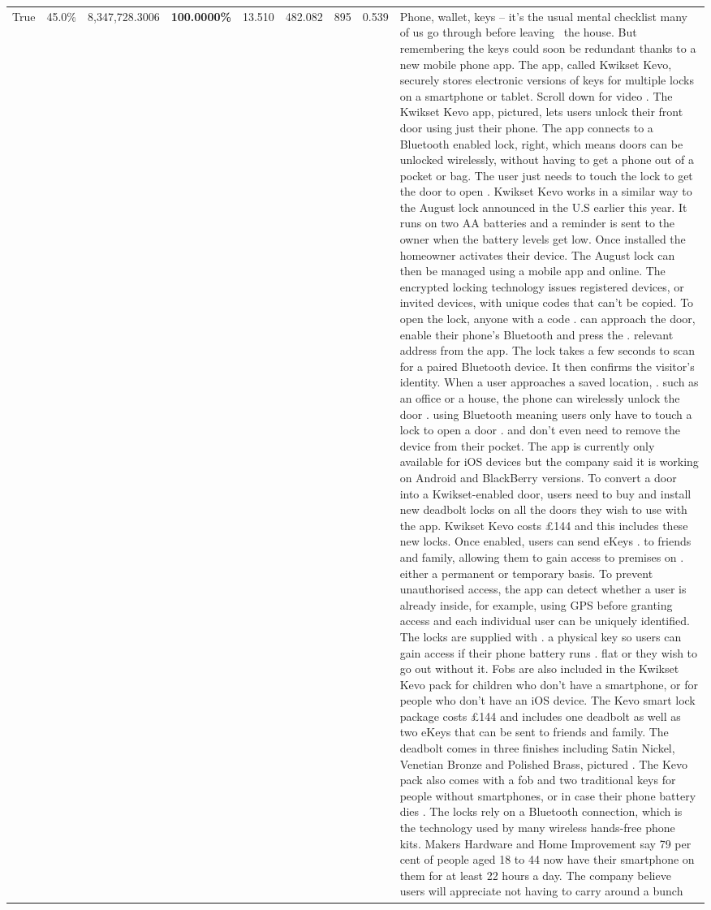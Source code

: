 \begin{table}[H]
\begin{tabular}{lllrlllll}
True & 45.0\% & 8,347,728.3006 & \bfseries \color{red} 100.0000\% & 13.510 & 482.082 & 895 & 0.539 & Phone, wallet, keys – it’s the usual mental checklist many of us go through before leaving  the house. But remembering the keys could soon be redundant thanks to a new mobile phone app. The app, called Kwikset Kevo, securely stores electronic versions of keys for multiple locks on a smartphone or tablet. Scroll down for video . The Kwikset Kevo app, pictured, lets users unlock their front door using just their phone. The app connects to a Bluetooth enabled lock, right, which means doors can be unlocked wirelessly, without having to get a phone out of a pocket or bag. The user just needs to touch the lock to get the door to open . Kwikset Kevo works in a similar way to the August lock announced in the U.S earlier this year. It runs on two AA batteries and a reminder is sent to the owner when the battery levels get low. Once installed the homeowner activates their device. The August lock can then be managed using a mobile app and online. The encrypted locking technology issues registered devices, or invited devices, with unique codes that can't be copied. To open the lock, anyone with a code . can approach the door, enable their phone's Bluetooth and press the . relevant address from the app. The lock takes a few seconds to scan for a paired Bluetooth device. It then confirms the visitor's identity. When a user approaches a saved location, . such as an office or a house, the phone can wirelessly unlock the door . using Bluetooth meaning users only have to touch a lock to open a door . and don't even need to remove the device from their pocket. The app is currently only available for iOS devices but the company said it is working on Android and BlackBerry versions. To convert a door into a Kwikset-enabled door, users need to buy and install new deadbolt locks on all the doors they wish to use with the app. Kwikset Kevo costs £144 and this includes these new locks. Once enabled, users can send eKeys . to friends and family, allowing them to gain access to premises on . either a permanent or temporary basis. To prevent unauthorised access, the app can detect whether a user is already inside, for example, using GPS before granting access and each individual user can be uniquely identified. The locks are supplied with . a physical key so users can gain access if their phone battery runs . flat or they wish to go out without it. Fobs are also included in the Kwikset Kevo pack for children who don't have a smartphone, or for people who don't have an iOS device. The Kevo smart lock package costs £144 and includes one deadbolt as well as two eKeys that can be sent to friends and family. The deadbolt comes in three finishes including Satin Nickel, Venetian Bronze and Polished Brass, pictured . The Kevo pack also comes with a fob and two traditional keys for people without smartphones, or in case their phone battery dies . The locks rely on a Bluetooth connection, which is the technology used by many wireless hands-free phone kits. Makers Hardware and Home Improvement say 79 per cent of people aged 18 to 44 now have their smartphone on them for at least 22 hours a day. The company believe users will appreciate not having to carry around a bunch 
\end{tabular}
\end{table}
